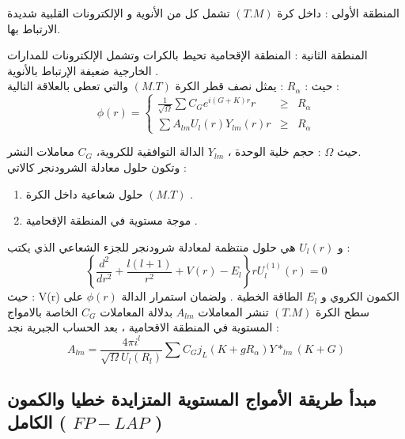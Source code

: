 المنطقة الأولى : داخل كرة $ (T.M) $ تشمل كل من الأنوية و الإلكترونات القلبية شديدة الارتباط بها.

المنطقة الثانية : المنطقة الإقحامية تحيط بالكرات وتشمل الإلكترونات للمدارات الخارجية ضعيفة الإرتباط  بالأنوية .\\
حيث :
$ R_{\alpha} $ : 	يمثل نصف قطر الكرة $ (M.T) $ والتي تعطى بالعلاقة التالية :		
\begin{equation}\label{}
	\phi (r) = \left\{\begin{array}{rcl}
		\frac{1}{\sqrt{\Omega}} \sum C_{G} e^{i(G+K)r}r & \geqslant & R_{\alpha} \\
		\sum A_{lm} U_{l} (r) Y_{lm}(r) r & \geqslant & R_{\alpha}
	\end{array} \right.
\end{equation}

حيث $ \Omega $ : حجم خلية الوحدة ، $ Y_{lm} $ الدالة التوافقية للكروية، $ C_{G} $ معاملات النشر.\\
وتكون حلول معادلة الشرودنجر كالاتي :
\begin{enumerate}
	\item  
	حلول شعاعية داخل الكرة $ (M.T)  $ . 
	\item 
	موجة مستوية في المنطقة الإقحامية .
\end{enumerate}
و  $ U_{l} (r) $ هي حلول منتظمة لمعادلة شرودنجر للجزء الشعاعي الذي يكتب  :		
\begin{equation}\label{}
	\left\{\frac{d^{2}}{dr^{2}} + \dfrac{l(l+1)}{r^{2}} + V(r) - E_{l} \right\} r U_{l}^{(1)} (r) = 0 
\end{equation}
حيث : V(r) الكمون الكروي و $  E_{l} $  الطاقة الخطية .
ولضمان استمرار الدالة $ \phi (r) $ على سطح الكرة $ (T.M) $ تنشر المعاملات $ A_{lm} $ بدلالة المعاملات $ C_{G} $ الخاصة بالامواج المستوية في  المنطقة الاقحامية ، بعد الحساب الجبرية نجد :
\begin{equation}\label{}
	A_{lm} = \dfrac{4\pi i^{l}}{\sqrt{\Omega} U_{l} (R_{l})} \sum C_{G} j_{L} ( K + g  R_{\alpha}) Y*_{lm} (K+G)
\end{equation}


\subsection{ مبدأ طريقة الأمواج المستوية المتزايدة خطيا والكمون الكامل ( $ FP-LAP $ ) }

